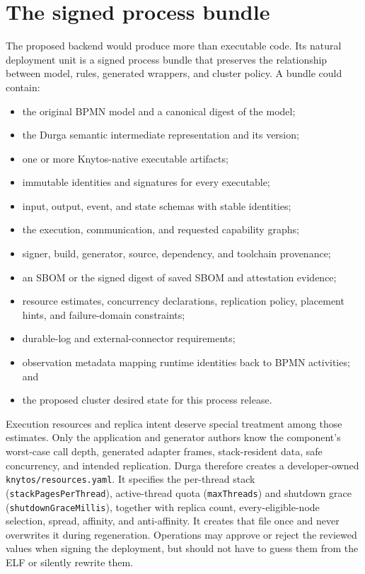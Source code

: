 \section{The signed process bundle}

The proposed backend would produce more than executable code. Its natural
deployment unit is a signed process bundle that preserves the relationship
between model, rules, generated wrappers, and cluster policy. A bundle could
contain:

\begin{itemize}
    \item the original BPMN model and a canonical digest of the model;
    \item the Durga semantic intermediate representation and its version;
    \item one or more Knytos-native executable artifacts;
    \item immutable identities and signatures for every executable;
    \item input, output, event, and state schemas with stable identities;
    \item the execution, communication, and requested capability graphs;
    \item signer, build, generator, source, dependency, and toolchain
        provenance;
    \item an SBOM or the signed digest of saved SBOM and attestation
        evidence;
    \item resource estimates, concurrency declarations, replication policy,
        placement hints, and failure-domain constraints;
    \item durable-log and external-connector requirements;
    \item observation metadata mapping runtime identities back to BPMN
        activities; and
    \item the proposed cluster desired state for this process release.
\end{itemize}

Execution resources and replica intent deserve special treatment among those estimates. Only the application
and generator authors know the component's worst-case call depth, generated
adapter frames, stack-resident data, safe concurrency, and intended replication. Durga therefore
creates a developer-owned \texttt{knytos/resources.yaml}. It specifies the
per-thread stack (\texttt{stackPagesPerThread}), active-thread quota
(\texttt{maxThreads}) and shutdown grace (\texttt{shutdownGraceMillis}), together with replica count,
every-eligible-node selection, spread, affinity, and anti-affinity. It creates that
file once and never overwrites it during regeneration. Operations may approve
or reject the reviewed values when signing the deployment, but should not have
to guess them from the ELF or silently rewrite them.


